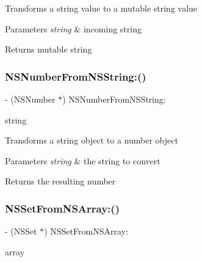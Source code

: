 Transforms a string value to a mutable string value 
\begin{DoxyParams}{Parameters}
{\em string} & incoming string \\
\hline
\end{DoxyParams}
\begin{DoxyReturn}{Returns}
mutable string 
\end{DoxyReturn}
\mbox{\label{interface_o_p_t_l_y_j_s_o_n_value_transformer_a6db84db78c906d7a8f34c80bf09e3c7d}} 
\subsubsection{\texorpdfstring{N\+S\+Number\+From\+N\+S\+String\+:()}{NSNumberFromNSString:()}}
{\footnotesize\ttfamily -\/ (N\+S\+Number $\ast$) N\+S\+Number\+From\+N\+S\+String\+: \begin{DoxyParamCaption}\item[{(N\+S\+String $\ast$)}]{string }\end{DoxyParamCaption}}

Transforms a string object to a number object 
\begin{DoxyParams}{Parameters}
{\em string} & the string to convert \\
\hline
\end{DoxyParams}
\begin{DoxyReturn}{Returns}
the resulting number 
\end{DoxyReturn}
\mbox{\label{interface_o_p_t_l_y_j_s_o_n_value_transformer_ac2e99a0aa46534302bafca4746b18d55}} 
\subsubsection{\texorpdfstring{N\+S\+Set\+From\+N\+S\+Array\+:()}{NSSetFromNSArray:()}}
{\footnotesize\ttfamily -\/ (N\+S\+Set $\ast$) N\+S\+Set\+From\+N\+S\+Array\+: \begin{DoxyParamCaption}\item[{(N\+S\+Array $\ast$)}]{array }\end{DoxyParamCaption}}

